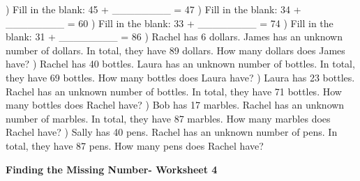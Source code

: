 \documentclass{article}%
\begin{document}
\newline%
\newline%
) Fill in the blank: 45 + \_\_\_\_\_\_\_\_ = 47%
\newline%
\newline%
) Fill in the blank: 34 + \_\_\_\_\_\_\_\_ = 60%
\newline%
\newline%
) Fill in the blank: 33 + \_\_\_\_\_\_\_\_ = 74%
\newline%
\newline%
) Fill in the blank: 31 + \_\_\_\_\_\_\_\_ = 86%
\newline%
\newline%
) Rachel has 6 dollars. James has an unknown number of dollars. In total, they have 89 dollars. How many dollars does James have?%
\newline%
\newline%
) Rachel has 40 bottles. Laura has an unknown number of bottles. In total, they have 69 bottles. How many bottles does Laura have?%
\newline%
\newline%
) Laura has 23 bottles. Rachel has an unknown number of bottles. In total, they have 71 bottles. How many bottles does Rachel have?%
\newline%
\newline%
) Bob has 17 marbles. Rachel has an unknown number of marbles. In total, they have 87 marbles. How many marbles does Rachel have?%
\newline%
\newline%
) Sally has 40 pens. Rachel has an unknown number of pens. In total, they have 87 pens. How many pens does Rachel have?%
\newline%
\newline%
\newline%
\pagebreak%
\large%
\begin{center}%
\textbf{Finding the Missing Number- Worksheet 4}%
\newline%
\end{center} \normalsize%
\end{document}

